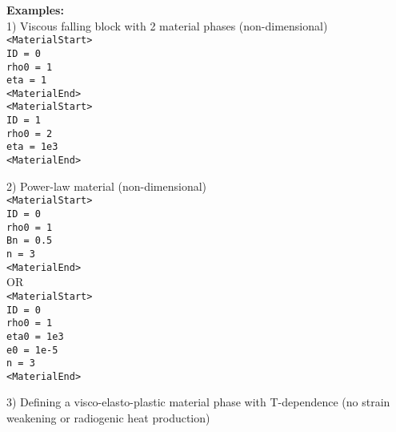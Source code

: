 \documentclass[a4paper,11pt]{article}
\begin{document}
\textbf{Examples:}\\

1) Viscous falling block with 2 material phases (non-dimensional)\\ 
{\small
\indent \texttt{<MaterialStart>}\\
\indent \indent \texttt{ID = 0}\\
\indent \indent \texttt{rho0 = 1}\\
\indent \indent \texttt{eta = 1}\\
\indent \texttt{<MaterialEnd>}\\

\indent \texttt{<MaterialStart>}\\
\indent \indent \texttt{ID = 1}\\
\indent \indent \texttt{rho0 = 2}\\
\indent \indent \texttt{eta = 1e3}\\
\indent \texttt{<MaterialEnd>}\\}

2) Power-law material (non-dimensional)\\ 
{\small
\indent \texttt{<MaterialStart>}\\
\indent \indent \texttt{ID = 0}\\
\indent \indent \texttt{rho0 = 1}\\
\indent \indent \texttt{Bn = 0.5}\\
\indent \indent \texttt{n = 3}\\
\indent \texttt{<MaterialEnd>}\\
\indent \indent OR\\
\indent \texttt{<MaterialStart>}\\
\indent \indent \texttt{ID = 0}\\
\indent \indent \texttt{rho0 = 1}\\
\indent \indent \texttt{eta0 = 1e3}\\
\indent \indent \texttt{e0 = 1e-5}\\
\indent \indent \texttt{n  = 3}\\
\indent \texttt{<MaterialEnd>}\\}

3) Defining a visco-elasto-plastic material phase with T-dependence (no strain weakening or radiogenic heat production)\\
\end{document}
